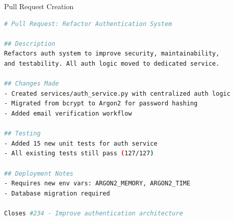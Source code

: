 \documentclass[aspectratio=169,11pt]{beamer}
\begin{document}
\begin{frame}[fragile]{Pull Request Creation}
    \begin{lstlisting}[language=bash, basicstyle=\ttfamily\small, title=Generated PR Description]
# Pull Request: Refactor Authentication System

## Description
Refactors auth system to improve security, maintainability,
and testability. All auth logic moved to dedicated service.

## Changes Made
- Created services/auth_service.py with centralized auth logic
- Migrated from bcrypt to Argon2 for password hashing
- Added email verification workflow

## Testing
- Added 15 new unit tests for auth service
- All existing tests still pass (127/127)

## Deployment Notes
- Requires new env vars: ARGON2_MEMORY, ARGON2_TIME
- Database migration required

Closes #234 - Improve authentication architecture
    \end{lstlisting}

\end{frame}
\end{document}
